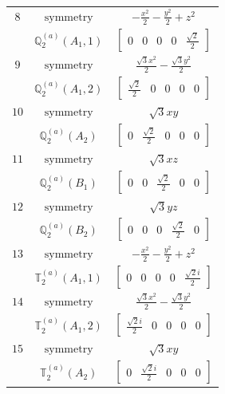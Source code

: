 \documentclass[fleqn,8pt,landscape]{jsarticle}
\begin{document}
\begin{longtable}{ccc}
$ 8 $ & $ \text{symmetry} $ & $ - \frac{x^{2}}{2} - \frac{y^{2}}{2} + z^{2} $ \\
$  $ & $ \mathbb{Q}_{2}^{(a)}(A_{1},1) $ & $ \begin{bmatrix} 0 & 0 & 0 & 0 & \frac{\sqrt{2}}{2} \end{bmatrix} $ \\ \hline
$ 9 $ & $ \text{symmetry} $ & $ \frac{\sqrt{3} x^{2}}{2} - \frac{\sqrt{3} y^{2}}{2} $ \\
$  $ & $ \mathbb{Q}_{2}^{(a)}(A_{1},2) $ & $ \begin{bmatrix} \frac{\sqrt{2}}{2} & 0 & 0 & 0 & 0 \end{bmatrix} $ \\ \hline
$ 10 $ & $ \text{symmetry} $ & $ \sqrt{3} x y $ \\
$  $ & $ \mathbb{Q}_{2}^{(a)}(A_{2}) $ & $ \begin{bmatrix} 0 & \frac{\sqrt{2}}{2} & 0 & 0 & 0 \end{bmatrix} $ \\ \hline
$ 11 $ & $ \text{symmetry} $ & $ \sqrt{3} x z $ \\
$  $ & $ \mathbb{Q}_{2}^{(a)}(B_{1}) $ & $ \begin{bmatrix} 0 & 0 & \frac{\sqrt{2}}{2} & 0 & 0 \end{bmatrix} $ \\ \hline
$ 12 $ & $ \text{symmetry} $ & $ \sqrt{3} y z $ \\
$  $ & $ \mathbb{Q}_{2}^{(a)}(B_{2}) $ & $ \begin{bmatrix} 0 & 0 & 0 & \frac{\sqrt{2}}{2} & 0 \end{bmatrix} $ \\ \hline
$ 13 $ & $ \text{symmetry} $ & $ - \frac{x^{2}}{2} - \frac{y^{2}}{2} + z^{2} $ \\
$  $ & $ \mathbb{T}_{2}^{(a)}(A_{1},1) $ & $ \begin{bmatrix} 0 & 0 & 0 & 0 & \frac{\sqrt{2} i}{2} \end{bmatrix} $ \\ \hline
$ 14 $ & $ \text{symmetry} $ & $ \frac{\sqrt{3} x^{2}}{2} - \frac{\sqrt{3} y^{2}}{2} $ \\
$  $ & $ \mathbb{T}_{2}^{(a)}(A_{1},2) $ & $ \begin{bmatrix} \frac{\sqrt{2} i}{2} & 0 & 0 & 0 & 0 \end{bmatrix} $ \\ \hline
$ 15 $ & $ \text{symmetry} $ & $ \sqrt{3} x y $ \\
$  $ & $ \mathbb{T}_{2}^{(a)}(A_{2}) $ & $ \begin{bmatrix} 0 & \frac{\sqrt{2} i}{2} & 0 & 0 & 0 \end{bmatrix} $ \\ \hline

\end{longtable}
\end{document}
